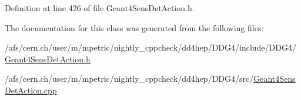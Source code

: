 Definition at line 426 of file Geant4\+Sens\+Det\+Action.\+h.



The documentation for this class was generated from the following files\+:\begin{DoxyCompactItemize}
\item 
/afs/cern.\+ch/user/m/mpetric/nightly\+\_\+cppcheck/dd4hep/\+D\+D\+G4/include/\+D\+D\+G4/\hyperlink{_geant4_sens_det_action_8h}{Geant4\+Sens\+Det\+Action.\+h}\item 
/afs/cern.\+ch/user/m/mpetric/nightly\+\_\+cppcheck/dd4hep/\+D\+D\+G4/src/\hyperlink{_geant4_sens_det_action_8cpp}{Geant4\+Sens\+Det\+Action.\+cpp}\end{DoxyCompactItemize}
